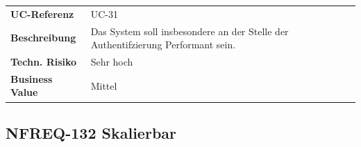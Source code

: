 \begin{longtable}[c]{@{}ll@{}}
\toprule
\begin{minipage}[t]{0.20\columnwidth}\raggedright\strut
\textbf{UC-Referenz}
\strut\end{minipage} &
\begin{minipage}[t]{0.74\columnwidth}\raggedright\strut
UC-31
\strut\end{minipage}\tabularnewline
\begin{minipage}[t]{0.20\columnwidth}\raggedright\strut
\textbf{Beschreibung}
\strut\end{minipage} &
\begin{minipage}[t]{0.74\columnwidth}\raggedright\strut
Das System soll insbesondere an der Stelle der Authentifzierung
Performant sein.
\strut\end{minipage}\tabularnewline
\begin{minipage}[t]{0.20\columnwidth}\raggedright\strut
\textbf{Techn. Risiko}
\strut\end{minipage} &
\begin{minipage}[t]{0.74\columnwidth}\raggedright\strut
Sehr hoch
\strut\end{minipage}\tabularnewline
\begin{minipage}[t]{0.20\columnwidth}\raggedright\strut
\textbf{Business Value}
\strut\end{minipage} &
\begin{minipage}[t]{0.74\columnwidth}\raggedright\strut
Mittel
\strut\end{minipage}\tabularnewline
\bottomrule
\end{longtable}

\subsection{NFREQ-132 Skalierbar}\label{nfreq-132-skalierbar}

